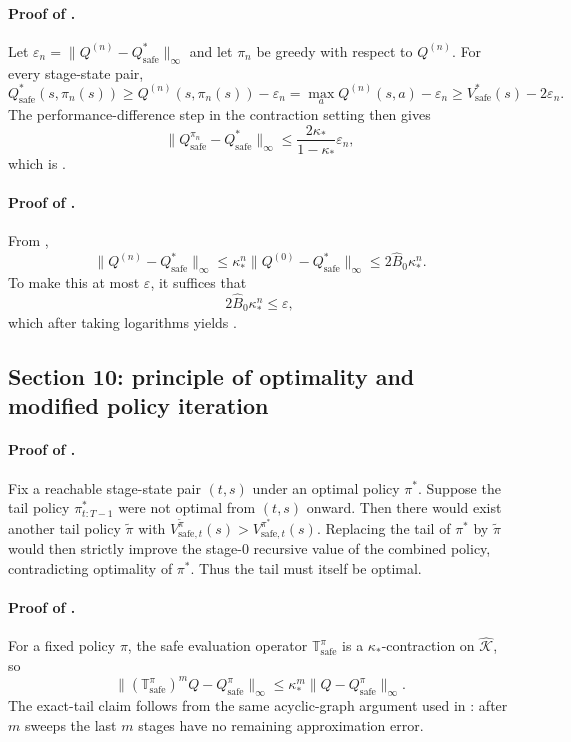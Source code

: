 \documentclass{article}
\theoremstyle{remark}
\newcommand{\safe}{\mathrm{safe}}
\newcommand{\Ksafe}{\widehat{\mathcal K}}
\newcommand{\Bhat}{\widehat B}
\begin{document}
\paragraph{Proof of .}
Let $\varepsilon_n=\|Q^{(n)}-Q_\safe^*\|_\infty$ and let $\pi_n$ be greedy with respect to $Q^{(n)}$.
For every stage-state pair,
\[
Q_\safe^*(s,\pi_n(s))\ge Q^{(n)}(s,\pi_n(s)) - \varepsilon_n = \max_a Q^{(n)}(s,a)-\varepsilon_n \ge V_\safe^*(s)-2\varepsilon_n.
\]
The performance-difference step in the contraction setting then gives
\[
\|Q_\safe^{\pi_n}-Q_\safe^*\|_\infty\le \frac{2\kappa_*}{1-\kappa_*}\varepsilon_n,
\]
which is .

\paragraph{Proof of .}
From ,
\[
\|Q^{(n)}-Q_\safe^*\|_\infty\le \kappa_*^n \|Q^{(0)}-Q_\safe^*\|_\infty\le 2\Bhat_0\kappa_*^n.
\]
To make this at most $\varepsilon$, it suffices that
\[
2\Bhat_0\kappa_*^n\le \varepsilon,
\]
which after taking logarithms yields .

\subsection{Section 10: principle of optimality and modified policy iteration}
\label{app:principle-mpi}

\paragraph{Proof of .}
Fix a reachable stage-state pair $(t,s)$ under an optimal policy $\pi^*$.
Suppose the tail policy $\pi^*_{t:T-1}$ were not optimal from $(t,s)$ onward.
Then there would exist another tail policy $\tilde\pi$ with $V_{\safe,t}^{\tilde\pi}(s)>V_{\safe,t}^{\pi^*}(s)$.
Replacing the tail of $\pi^*$ by $\tilde\pi$ would then strictly improve the stage-$0$ recursive value of the combined policy, contradicting optimality of $\pi^*$.
Thus the tail must itself be optimal.

\paragraph{Proof of .}
For a fixed policy $\pi$, the safe evaluation operator $\mathbb T_\safe^{\pi}$ is a $\kappa_*$-contraction on $\Ksafe$, so
\[
\|(\mathbb T_\safe^{\pi})^mQ-Q_\safe^{\pi}\|_\infty\le \kappa_*^m\|Q-Q_\safe^{\pi}\|_\infty.
\]
The exact-tail claim follows from the same acyclic-graph argument used in : after $m$ sweeps the last $m$ stages have no remaining approximation error.
\end{document}

